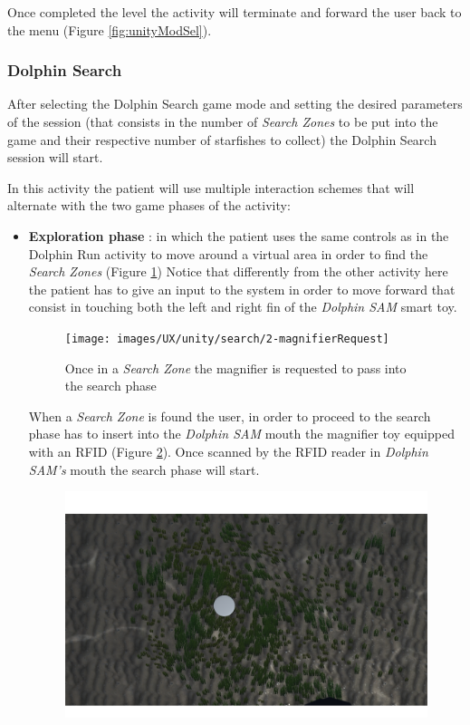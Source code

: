 Once completed the level the activity will terminate and forward the user back to the menu (Figure \ref{fig:unityModSel}).
\subsubsection{Dolphin Search}
After selecting the Dolphin Search game mode and setting the desired parameters of the session (that consists in the number of \textit{Search Zones} to be put into the game and their respective number of starfishes to collect) the Dolphin Search session will start.

In this activity the patient will use multiple interaction schemes that will alternate with the two game phases of the activity:
\pagebreak
\begin{itemize}
	\begin{figure}[h!]
		\texttt{[image: images/UX/unity/search/1-searchZone]}
		\caption{Represents a \textit{Search Zone} inside the gaming area.}
		\label{fig:unitySearchZone}
	\end{figure}
	\item \textbf{Exploration phase} : in which the patient uses the same controls as in the Dolphin Run activity to move around a virtual area in order to find the \textit{Search Zones} (Figure \ref{fig:unitySearchZone}) Notice that differently from the other activity here the patient has to give an input to the system in order to move forward that consist in touching both the left and right fin of the \textit{Dolphin SAM} smart toy. 
	\begin{figure}[h!]
			\texttt{[image: images/UX/unity/search/2-magnifierRequest]}
			\caption{Once in a \textit{Search Zone} the magnifier is requested to pass into the search phase}
			\label{fig:unityMagnifierRequest}
	\end{figure}
	When a \textit{Search Zone} is found the user, in order to proceed to the search phase has to insert into the \textit{Dolphin SAM} mouth the magnifier toy equipped with an RFID (Figure \ref{fig:unityMagnifierRequest}).
	Once scanned by the RFID reader in \textit{Dolphin SAM's} mouth the search phase will start.
	\begin{figure}[h!]
		\includegraphics[width=\textwidth]{images/UX/unity/search/3-magnifierFocus}

\end{figure}
\end{itemize}
